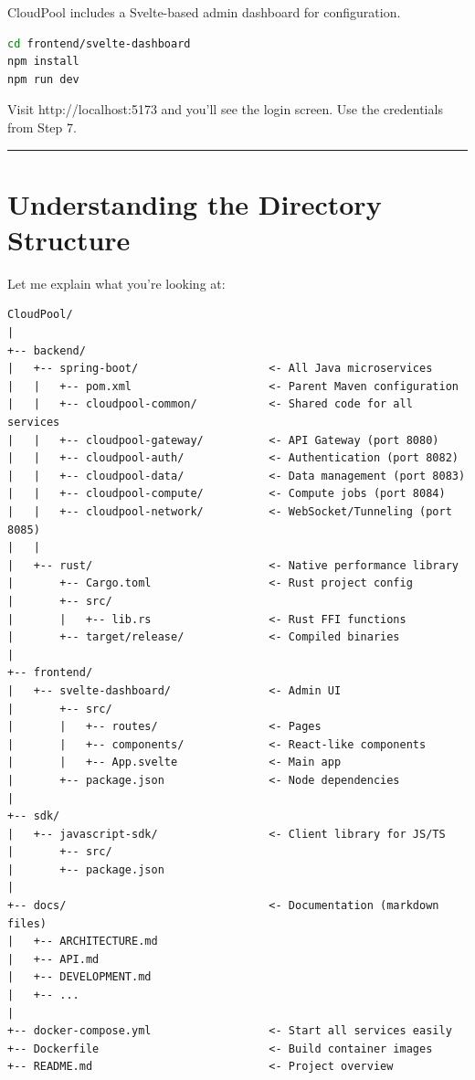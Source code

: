 \documentclass[11pt,a4paper]{report}
\begin{document}
CloudPool includes a Svelte-based admin dashboard for configuration.

\begin{lstlisting}[language=bash]
cd frontend/svelte-dashboard
npm install
npm run dev
\end{lstlisting}

Visit http://localhost:5173 and you'll see the login screen. Use the credentials from Step 7.


\vfill\hrule\vfill



\chapter{Understanding the Directory Structure}


Let me explain what you're looking at:

\begin{lstlisting}[language=text]
CloudPool/
|
+-- backend/
|   +-- spring-boot/                    <- All Java microservices
|   |   +-- pom.xml                     <- Parent Maven configuration
|   |   +-- cloudpool-common/           <- Shared code for all services
|   |   +-- cloudpool-gateway/          <- API Gateway (port 8080)
|   |   +-- cloudpool-auth/             <- Authentication (port 8082)
|   |   +-- cloudpool-data/             <- Data management (port 8083)
|   |   +-- cloudpool-compute/          <- Compute jobs (port 8084)
|   |   +-- cloudpool-network/          <- WebSocket/Tunneling (port 8085)
|   |
|   +-- rust/                           <- Native performance library
|       +-- Cargo.toml                  <- Rust project config
|       +-- src/
|       |   +-- lib.rs                  <- Rust FFI functions
|       +-- target/release/             <- Compiled binaries
|
+-- frontend/
|   +-- svelte-dashboard/               <- Admin UI
|       +-- src/
|       |   +-- routes/                 <- Pages
|       |   +-- components/             <- React-like components
|       |   +-- App.svelte              <- Main app
|       +-- package.json                <- Node dependencies
|
+-- sdk/
|   +-- javascript-sdk/                 <- Client library for JS/TS
|       +-- src/
|       +-- package.json
|
+-- docs/                               <- Documentation (markdown files)
|   +-- ARCHITECTURE.md
|   +-- API.md
|   +-- DEVELOPMENT.md
|   +-- ...
|
+-- docker-compose.yml                  <- Start all services easily
+-- Dockerfile                          <- Build container images
+-- README.md                           <- Project overview
\end{lstlisting}
\end{document}
